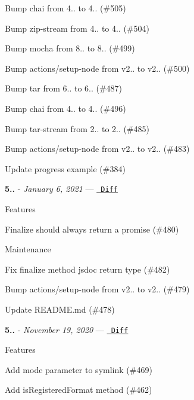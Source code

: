 \begin{DoxyItemize}
\item Bump chai from 4.. to 4.. (\#505)
\item Bump zip-\/stream from 4.. to 4.. (\#504)
\item Bump mocha from 8.. to 8.. (\#499)
\item Bump actions/setup-\/node from v2.. to v2.. (\#500)
\item Bump tar from 6.. to 6.. (\#487)
\item Bump chai from 4.. to 4.. (\#496)
\item Bump tar-\/stream from 2.. to 2.. (\#485)
\item Bump actions/setup-\/node from v2.. to v2.. (\#483)
\item Update progress example (\#384)
\end{DoxyItemize}

{\bfseries{5..}} -\/ 
\footnotesize {\itshape January 6, 2021}
\normalsize  — \href{https://github.com/archiverjs/node-archiver/compare/5.1.0...5.2.0}{\texttt{ Diff}}

Features


\begin{DoxyItemize}
\item Finalize should always return a promise (\#480)
\end{DoxyItemize}

Maintenance


\begin{DoxyItemize}
\item Fix finalize method jsdoc return type (\#482)
\item Bump actions/setup-\/node from v2.. to v2.. (\#479)
\item Update README.\+md (\#478)
\end{DoxyItemize}

{\bfseries{5..}} -\/ 
\footnotesize {\itshape November 19, 2020}
\normalsize  — \href{https://github.com/archiverjs/node-archiver/compare/5.0.2...5.1.0}{\texttt{ Diff}}

Features


\begin{DoxyItemize}
\item Add mode parameter to symlink (\#469)
\item Add is\+Registered\+Format method (\#462)
\end{DoxyItemize}

